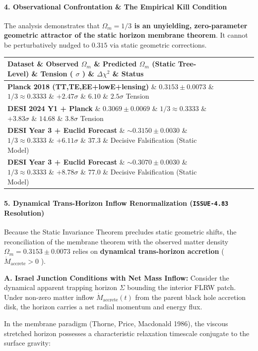 \documentclass[11pt,a4paper]{article}
\theoremstyle{definition}\newtheorem{definition}{Definition}
\theoremstyle{remark}\newtheorem{remark}{Remark}
\begin{document}
\paragraph{4. Observational Confrontation \& The Empirical Kill Condition}

The analysis demonstrates that \textbf{$\Omega_m = 1/3$ is an unyielding, zero-parameter geometric attractor of the static horizon membrane theorem}. It cannot be perturbatively nudged to $0.315$ via static geometric corrections.

\begin{longtable}{llllll}
\hline
Dataset \& Observed $\Omega_m$ \& Predicted $\Omega_m$ (Static Tree-Level) \& Tension ( $\sigma$ ) \& $\Delta\chi^2$ \& Status \\
\hline
\textbf{Planck 2018 (TT,TE,EE+lowE+lensing)} \& $0.3153 \pm 0.0073$ \& $1/3 \approx 0.3333$ \& $+2.47\sigma$ \& $6.10$ \& $2.5\sigma$ Tension \\
\textbf{DESI 2024 Y1 + Planck} \& $0.3069 \pm 0.0069$ \& $1/3 \approx 0.3333$ \& $+3.83\sigma$ \& $14.68$ \& $3.8\sigma$ Tension \\
\textbf{DESI Year 3 + Euclid Forecast} \& $\sim 0.3150 \pm 0.0030$ \& $1/3 \approx 0.3333$ \& $+6.11\sigma$ \& $37.3$ \& Decisive Falsification (Static Model) \\
\textbf{DESI Year 3 + Euclid Forecast} \& $\sim 0.3070 \pm 0.0030$ \& $1/3 \approx 0.3333$ \& $+8.78\sigma$ \& $77.0$ \& Decisive Falsification (Static Model) \\
\hline
\end{longtable}\paragraph{5. Dynamical Trans-Horizon Inflow Renormalization (\texttt{ISSUE-4.83} Resolution)}

Because the Static Invariance Theorem precludes static geometric shifts, the reconciliation of the membrane theorem with the observed matter density $\Omega_m = 0.3153 \pm 0.0073$ relies on \textbf{dynamical trans-horizon accretion} ( $\dot{M}_{\text{accrete}} > 0$ ).

\textbf{A. Israel Junction Conditions with Net Mass Inflow:}
Consider the dynamical apparent trapping horizon $\Sigma$ bounding the interior FLRW patch. Under non-zero matter inflow $\dot{M}_{\text{accrete}}(t)$ from the parent black hole accretion disk, the horizon carries a net radial momentum and energy flux.

In the membrane paradigm (Thorne, Price, Macdonald 1986), the viscous stretched horizon possesses a characteristic relaxation timescale conjugate to the surface gravity:
\end{document}
